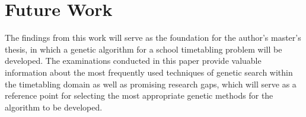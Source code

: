 \documentclass[sigconf]{acmart}
\begin{document}
\section{Future Work}
The findings from this work will serve as the foundation for the author's
master's thesis, in which a genetic algorithm for a school timetabling problem
will be developed.
The examinations conducted in this paper provide valuable information about the
most frequently used techniques of genetic search within the timetabling domain
as well as promising research gaps,
which will serve as a reference point for selecting the most appropriate
genetic methods for the algorithm to be developed.









\end{document}

